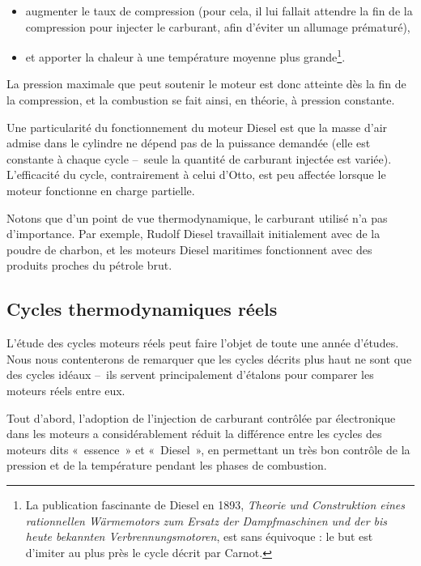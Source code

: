 		\begin{itemize}
			\item augmenter le taux de compression (pour cela, il lui fallait attendre la fin de la compression pour injecter le carburant, afin d’éviter un allumage prématuré),
			\item et apporter la chaleur à une température moyenne plus grande\footnote{La publication fascinante de Diesel en 1893, \textit{Theorie und Construktion eines rationnellen Wärmemotors zum Ersatz der Dampfmaschinen und der bis heute bekannten Verbrennungsmotoren}, est sans équivoque : le but est d’imiter au plus près le cycle décrit par Carnot.}\nolinebreak.
		\end{itemize}

		La pression maximale que peut soutenir le moteur est donc atteinte dès la fin de la compression, et la combustion se fait ainsi, en théorie, à pression constante.

		Une particularité du fonctionnement du moteur Diesel est que la masse d’air admise dans le cylindre ne dépend pas de la puissance demandée (elle est constante à chaque cycle --\ seule la quantité de carburant injectée est variée). L’efficacité du cycle, contrairement à celui d’Otto, est peu affectée lorsque le moteur fonctionne en charge partielle.

		Notons que d’un point de vue thermodynamique, le carburant utilisé n’a pas d’im\-por\-tan\-ce. Par exemple, Rudolf Diesel travaillait initialement avec de la poudre de charbon, et les moteurs Diesel maritimes fonctionnent avec des produits proches du pétrole brut.



	\subsection{Cycles thermodynamiques réels}

		L’étude des cycles moteurs réels peut faire l’objet de toute une année d’études. Nous nous contenterons de remarquer que les cycles décrits plus haut ne sont que des cycles idéaux --\ ils servent principalement d’étalons pour comparer les moteurs réels entre eux.

		Tout d’abord, l’adoption de l’injection de carburant contrôlée par électronique dans les moteurs a considérablement réduit la différence entre les cycles des moteurs dits «~essence~» et «~Diesel~», en permettant un très bon contrôle de la pression et de la température pendant les phases de combustion.

